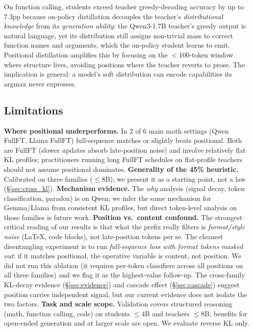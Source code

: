 \documentclass[10pt]{article}
\begin{document}
On function calling, students exceed teacher greedy-decoding accuracy by up to 7.3pp because on-policy distillation decouples the teacher's \emph{distributional knowledge} from its \emph{generation ability}: the Qwen3-1.7B teacher's greedy output is natural language, yet its distribution still assigns non-trivial mass to correct function names and arguments, which the on-policy student learns to emit. Positional distillation amplifies this by focusing on the $<$100-token window where structure lives, avoiding positions where the teacher reverts to prose. The implication is general: a model's soft distribution can encode capabilities its argmax never expresses.

\subsection{Limitations}
\label{sec:limitations}

\textbf{Where positional underperforms.} In 2 of 6 main math settings (Qwen FullFT, Llama FullFT) full-sequence matches or slightly beats positional. Both are FullFT (slower updates absorb late-position noise) and involve relatively flat KL profiles; practitioners running long FullFT schedules on flat-profile teachers should not assume positional dominates.
\textbf{Generality of the 45\% heuristic.} Calibrated on three families ($\le$8B); we present it as a starting point, not a law (\S\ref{sec:cross_kl}).
\textbf{Mechanism evidence.} The \emph{why} analysis (signal decay, token classification, paradox) is on Qwen; we infer the same mechanism for Gemma/Llama from consistent KL profiles, but direct token-level analysis on those families is future work.
\textbf{Position vs.\ content confound.} The strongest critical reading of our results is that what the prefix really filters is \emph{format/style noise} (LaTeX, code blocks), not late-position tokens per se. The cleanest disentangling experiment is to run \emph{full-sequence loss with format tokens masked out}: if it matches positional, the operative variable is content, not position. We did not run this ablation (it requires per-token classifiers across all positions on all three families) and we flag it as the highest-value follow-up. The cross-family KL-decay evidence (\S\ref{sec:evidence}) and cascade effect (\S\ref{sec:cascade}) suggest position carries independent signal, but our current evidence does not isolate the two factors.
\textbf{Task and scale scope.} Validation covers structured reasoning (math, function calling, code) on students $\le$4B and teachers $\le$8B; benefits for open-ended generation and at larger scale are open. We evaluate reverse KL only.
\end{document}

